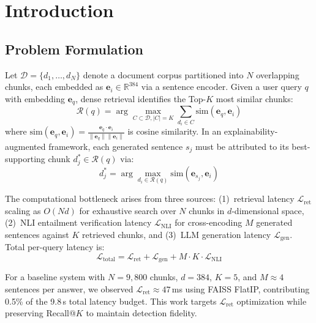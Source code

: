 \documentclass[conference]{IEEEtran}
\begin{document}
\section{Introduction}

\subsection{Problem Formulation}
Let $\mathcal{D} = \{d_1, \ldots, d_N\}$ denote a document corpus partitioned into $N$ overlapping chunks, each embedded as $\mathbf{e}_i \in \mathbb{R}^{384}$ via a sentence encoder. Given a user query $q$ with embedding $\mathbf{e}_q$, dense retrieval identifies the Top-$K$ most similar chunks:
\begin{equation}
\mathcal{R}(q) = \arg\max_{C \subset \mathcal{D}, |C|=K} \sum_{d_i \in C} \mathrm{sim}(\mathbf{e}_q, \mathbf{e}_i)
\label{eq:retrieval}
\end{equation}
where $\mathrm{sim}(\mathbf{e}_q, \mathbf{e}_i) = \frac{\mathbf{e}_q \cdot \mathbf{e}_i}{\|\mathbf{e}_q\| \|\mathbf{e}_i\|}$ is cosine similarity. In an explainability-augmented framework, each generated sentence $s_j$ must be attributed to its best-supporting chunk $d^*_j \in \mathcal{R}(q)$ via:
\begin{equation}
d^*_j = \arg\max_{d_i \in \mathcal{R}(q)} \mathrm{sim}(\mathbf{e}_{s_j}, \mathbf{e}_i)
\label{eq:attribution}
\end{equation}

The computational bottleneck arises from three sources: (1)~retrieval latency $\mathcal{L}_{\mathrm{ret}}$ scaling as $O(Nd)$ for exhaustive search over $N$ chunks in $d$-dimensional space, (2)~NLI entailment verification latency $\mathcal{L}_{\mathrm{NLI}}$ for cross-encoding $M$ generated sentences against $K$ retrieved chunks, and (3)~LLM generation latency $\mathcal{L}_{\mathrm{gen}}$. Total per-query latency is:
\begin{equation}
\mathcal{L}_{\mathrm{total}} = \mathcal{L}_{\mathrm{ret}} + \mathcal{L}_{\mathrm{gen}} + M \cdot K \cdot \mathcal{L}_{\mathrm{NLI}}
\label{eq:total_latency}
\end{equation}

For a baseline system with $N{=}9{,}800$ chunks, $d{=}384$, $K{=}5$, and $M{\approx}4$ sentences per answer, we observed $\mathcal{L}_{\mathrm{ret}} \approx 47$\,ms using FAISS FlatIP, contributing 0.5\% of the 9.8\,s total latency budget. This work targets $\mathcal{L}_{\mathrm{ret}}$ optimization while preserving Recall@$K$ to maintain detection fidelity.
\end{document}
